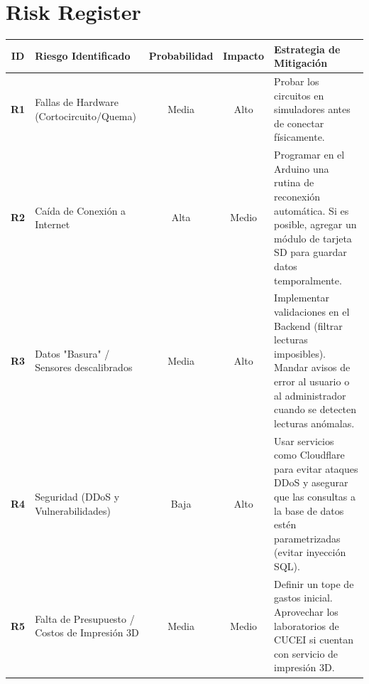 \section{Risk Register}

\noindent
\renewcommand{\arraystretch}{1.5}
\begin{tabularx}{\textwidth}{| c | >{\raggedright\arraybackslash}p{3.8cm} | c | c | >{\raggedright\arraybackslash}X |}
    \hline
    \textbf{ID} & \textbf{Riesgo Identificado} & \textbf{Probabilidad} & \textbf{Impacto} & \textbf{Estrategia de Mitigación} \\
    \hline
    \textbf{R1} & Fallas de Hardware (Cortocircuito/Quema) & Media & Alto & Probar los circuitos en simuladores antes de conectar físicamente. \\ \hline
    \textbf{R2} & Caída de Conexión a Internet & Alta & Medio & Programar en el Arduino una rutina de reconexión automática. Si es posible, agregar un módulo de tarjeta SD para guardar datos temporalmente. \\ \hline
    \textbf{R3} & Datos "Basura" / Sensores descalibrados & Media & Alto & Implementar validaciones en el Backend (filtrar lecturas imposibles). Mandar avisos de error al usuario o al administrador cuando se detecten lecturas anómalas. \\ \hline
    \textbf{R4} & Seguridad (DDoS y Vulnerabilidades) & Baja & Alto & Usar servicios como Cloudflare para evitar ataques DDoS y asegurar que las consultas a la base de datos estén parametrizadas (evitar inyección SQL). \\ \hline
    \textbf{R5} & Falta de Presupuesto / Costos de Impresión 3D & Media & Medio & Definir un tope de gastos inicial. Aprovechar los laboratorios de CUCEI si cuentan con servicio de impresión 3D. \\ \hline
\end{tabularx}